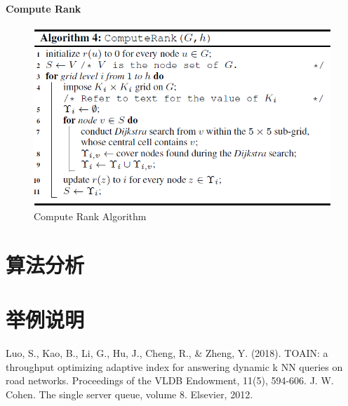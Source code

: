 \documentclass{ML}
\begin{document}
\paragraph{Compute Rank}
\begin{figure}[htb]
	\centering
	\includegraphics[width=0.8\linewidth]{media/compute_rank.png}
	\caption{Compute Rank Algorithm}\label{fig:compute_rank}
\end{figure}
\section{算法分析}

\section{举例说明}

\appendix

\begin{thebibliography}{20}
     Luo, S., Kao, B., Li, G., Hu, J., Cheng, R., \& Zheng, Y. (2018). TOAIN: a throughput optimizing adaptive index for answering dynamic k NN queries on road networks. Proceedings of the VLDB Endowment, 11(5), 594-606.
     J. W. Cohen. The single server queue, volume 8. Elsevier, 2012.
\end{thebibliography}
\end{document}
